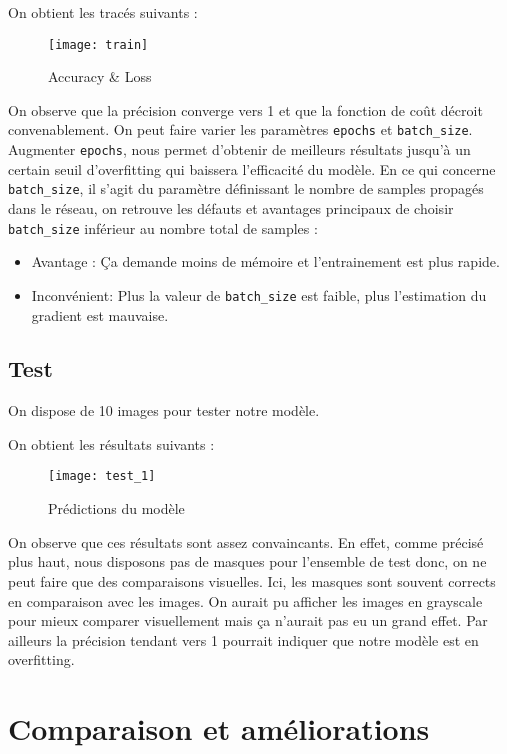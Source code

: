 \documentclass[12pt,a4paper,titlepage]{article}
\begin{document}
On obtient les tracés suivants :

\begin{figure}[H]
    \caption{Accuracy \& Loss}
    \texttt{[image: train]}
    \centering
\end{figure}

On observe que la précision converge vers 1 et que la fonction de coût décroit convenablement.
On peut faire varier les paramètres \texttt{epochs} et \texttt{batch\_size}. Augmenter \texttt{epochs},
nous permet d'obtenir de meilleurs résultats jusqu'à un certain seuil d'overfitting qui
baissera l'efficacité du modèle. En ce qui concerne \texttt{batch\_size}, il s'agit du
paramètre définissant le nombre de samples propagés dans le réseau, on retrouve les défauts
et avantages principaux de choisir \texttt{batch\_size} inférieur au nombre total de samples :

\begin{itemize}
    \item{Avantage : Ça demande moins de mémoire et l'entrainement est plus rapide.}
    \item{Inconvénient: Plus la valeur de \texttt{batch\_size} est faible, plus l'estimation
        du gradient est mauvaise.}
\end{itemize}

\subsection{Test}

On dispose de 10 images pour tester notre modèle.

On obtient les résultats suivants :

\begin{figure}[H]
    \caption{Prédictions du modèle}
    \texttt{[image: test\_1]}
    \centering
\end{figure}

On observe que ces résultats sont assez convaincants. En effet, comme précisé plus haut,
nous disposons pas de masques pour l'ensemble de test donc, on ne peut faire que des
comparaisons visuelles. Ici, les masques sont souvent corrects en comparaison avec les
images. On aurait pu afficher les images en grayscale pour mieux comparer visuellement
mais ça n'aurait pas eu un grand effet. Par ailleurs la précision tendant vers 1 pourrait
indiquer que notre modèle est en overfitting.

\section{Comparaison et améliorations}
\end{document}
